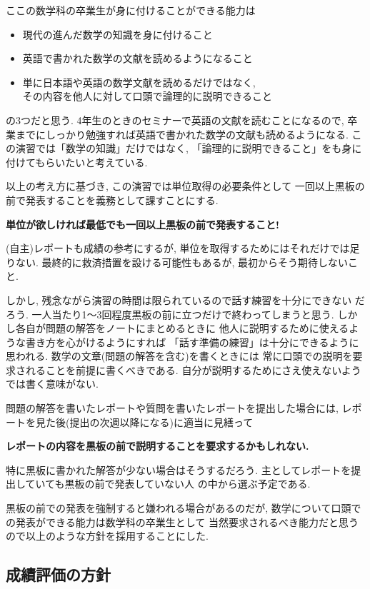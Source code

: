 \documentclass[12pt,twoside]{jarticle}
\begin{document}
ここの数学科の卒業生が身に付けることができる能力は
\begin{itemize}
 \item 現代の進んだ数学の知識を身に付けること
 \item 英語で書かれた数学の文献を読めるようになること
 \item 単に日本語や英語の数学文献を読めるだけではなく, \\
  その内容を他人に対して口頭で論理的に説明できること
\end{itemize}
の3つだと思う.  4年生のときのセミナーで英語の文献を読むことになるので,
卒業までにしっかり勉強すれば英語で書かれた数学の文献も読めるようになる.
この演習では「数学の知識」だけではなく, 
「論理的に説明できること」をも身に付けてもらいたいと考えている.

以上の考え方に基づき, 
この演習では単位取得の必要条件として
一回以上黒板の前で発表することを義務として課すことにする. 
\begin{center}
 \large\bf 単位が欲しければ最低でも一回以上黒板の前で発表すること!
\end{center}
(自主)レポートも成績の参考にするが, 
単位を取得するためにはそれだけでは足りない. 
最終的に救済措置を設ける可能性もあるが, 
最初からそう期待しないこと.

しかし, 残念ながら演習の時間は限られているので話す練習を十分にできない
だろう. 一人当たり1〜3回程度黒板の前に立つだけで終わってしまうと思う.
しかし各自が問題の解答をノートにまとめるときに
他人に説明するために使えるような書き方を心がけるようにすれば
「話す準備の練習」は十分にできるように思われる.
数学の文章(問題の解答を含む)を書くときには
常に口頭での説明を要求されることを前提に書くべきである.
自分が説明するためにさえ使えないようでは書く意味がない.

問題の解答を書いたレポートや質問を書いたレポートを提出した場合には, 
レポートを見た後(提出の次週以降になる)に適当に見繕って
\begin{center}
 \large\bf
 レポートの内容を黒板の前で説明することを要求するかもしれない.
\end{center}
特に黒板に書かれた解答が少ない場合はそうするだろう.
主としてレポートを提出していても黒板の前で発表していない人
の中から選ぶ予定である.

黒板の前での発表を強制すると嫌われる場合があるのだが, 
数学について口頭での発表ができる能力は数学科の卒業生として
当然要求されるべき能力だと思うので以上のような方針を採用することにした.

\subsection{成績評価の方針}
\end{document}
